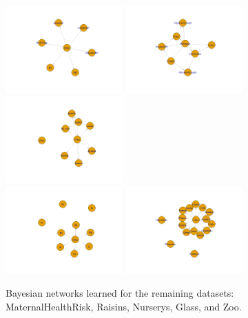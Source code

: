 \documentclass[runningheads]{llncs}
\begin{document}
\begin{figure}[htbp]
	\centering
	\includegraphics[width=0.4\textwidth]{IMG/6RED.png}
	\includegraphics[width=0.4\textwidth]{IMG/7RED.png}
	\includegraphics[width=0.4\textwidth]{IMG/8RED.png}\\[1ex]
	\includegraphics[width=0.4\textwidth]{IMG/9RED.png}
	\includegraphics[width=0.4\textwidth]{IMG/10RED.png}
	\caption{Bayesian networks learned for the remaining datasets: MaternalHealthRisk, Raisins, Nurserys, Glass, and Zoo.}
	\label{fig:networks_part2}
\end{figure}
\end{document}
